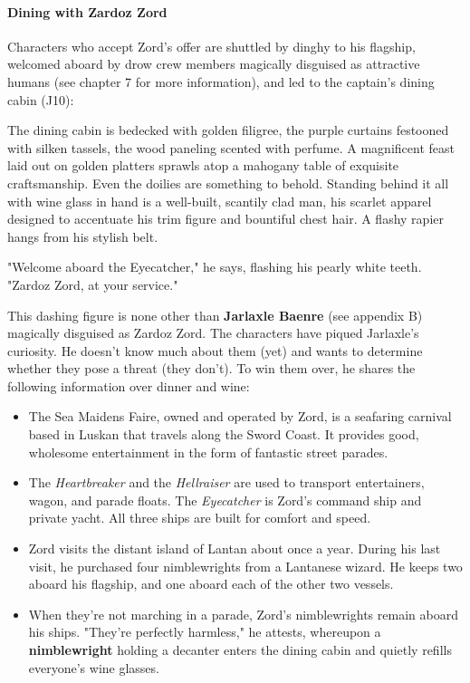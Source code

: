 \documentclass[10pt,a4paper,twoside,twocolumn,openany,nodeprecatedcode]{dndbook}
\begin{document}
\paragraph{Dining with Zardoz Zord}
Characters who accept Zord's offer are shuttled by dinghy to his flagship, welcomed aboard by drow crew members magically disguised as attractive humans (see chapter 7 for more information), and led to the captain's dining cabin (J10):
\begin{DndReadAloud}{}
The dining cabin is bedecked with golden filigree, the purple curtains festooned with silken tassels, the wood paneling scented with perfume. A magnificent feast laid out on golden platters sprawls atop a mahogany table of exquisite craftsmanship. Even the doilies are something to behold. Standing behind it all with wine glass in hand is a well-built, scantily clad man, his scarlet apparel designed to accentuate his trim figure and bountiful chest hair. A flashy rapier hangs from his stylish belt.

"Welcome aboard the Eyecatcher," he says, flashing his pearly white teeth. "Zardoz Zord, at your service."
\end{DndReadAloud}

This dashing figure is none other than \textbf{Jarlaxle Baenre} (see appendix B) magically disguised as Zardoz Zord.
The characters have piqued Jarlaxle's curiosity. He doesn't know much about them (yet) and wants to determine whether they pose a threat (they don't). To win them over, he shares the following information over dinner and wine:
\begin{itemize}

\item The Sea Maidens Faire, owned and operated by Zord, is a seafaring carnival based in Luskan that travels along the Sword Coast. It provides good, wholesome entertainment in the form of fantastic street parades.
\item The \textit{Heartbreaker} and the \textit{Hellraiser} are used to transport entertainers, wagon, and parade floats. The \textit{Eyecatcher} is Zord's command ship and private yacht. All three ships are built for comfort and speed.
\item Zord visits the distant island of Lantan about once a year. During his last visit, he purchased four nimblewrights from a Lantanese wizard. He keeps two aboard his flagship, and one aboard each of the other two vessels.
\item When they're not marching in a parade, Zord's nimblewrights remain aboard his ships. "They're perfectly harmless," he attests, whereupon a \textbf{nimblewright} holding a decanter enters the dining cabin and quietly refills everyone's wine glasses.
\end{itemize}
\end{document}
